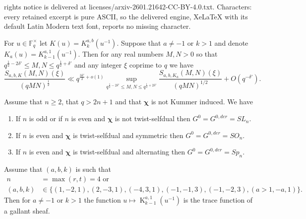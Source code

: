 \documentclass[10pt,a4paper]{amsart}
\DeclareMathOperator{\K}{K} %
\newcommand{\FF}{\mathbb{F}}
\renewcommand{\geq}{\geqslant}
\renewcommand{\leq}{\leqslant}
\begin{document}
rights notice is delivered at licenses/arxiv-2601.21642-CC-BY-4.0.txt. Characters: every retained excerpt is pure ASCII, so the delivered engine, XeLaTeX with its default Latin Modern text font, reports no missing character.
\begin{lem} \label{l:poissontrick} For $u\in \FF_q^{\times}$ let $K(u) = K_k^{a,b}(u^{-1})$.
Suppose that $a\neq -1$  or $k>1$ and denote $K_a(u) =  K_{k-1}^{a,1}(u^{-1})$.
    Then for any real numbers $M,N>0$ so that $q^{\frac{1}{2}-2\delta'}\leq M,N\leq q^{\frac{1}{2}+\delta'}$ and any integer $\xi$ coprime to $q$ we have 
    \[\frac{S_{a,b,K}(M,N)(\xi)}{(qMN)^{\frac{1}{2}}}\ll q^{\frac{3\delta'}{2}+o(1)}\sup_{q^{\frac{1}{2}-2\delta'}\leq M,N\leq q^{\frac{1}{2}+2\delta'}}\frac{S_{a,b,K_a}(M,N)(\xi)}{(qMN)^{1/2}} + O(q^{-\delta'}). \]
\end{lem}

\begin{thm}[Katz]\label{thm: Katz one set characters}
Assume that $n\geq 2$, that $q>2n+1$ and that $\bm{\chi}$ is not Kummer induced. 
We have
\begin{enumerate}
    \item  If $n$ is odd or if $n$ is even and $\bm{\chi}$ is not twist-selfdual then $G^0 = G^{0,der} = SL_n$.
\item  If $n$ is even and $\bm{\chi}$ is twist-selfdual and symmetric then $G^0 = G^{0,der} = SO_n$.
\item  If $n$ is even and $\bm{\chi}$ is twist-selfdual and alternating then $G^0 = G^{0,der} = Sp_n$.
\end{enumerate}
\end{thm}

\begin{lem}\label{lem: special cases}
Assume that $(a,b,k)$ is such that 
\begin{align*}
    n&=\max (r,t)=  4\text{  or}\\
    (a,b,k)&\in \{(1,-2,1), (2,-3,1),(-4,3,1),(-1,-1,3),(-1,-2,3),(a>1,-a,1)\}.
\end{align*}
Then for $a\neq -1$ or $k>1$ the function $u\mapsto \K_{k-1}^{a,1}(u^{-1})$ is the trace function of a gallant sheaf. 

\end{lem}
\end{document}
